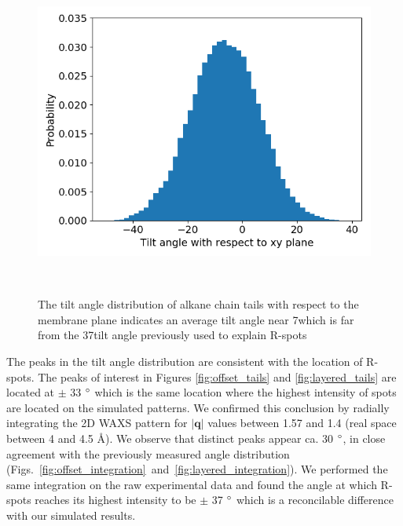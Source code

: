 \documentclass{article}
\begin{document}
  \begin{figure}
  \centering
  \includegraphics[width=0.5\linewidth]{tilt_dist.png}
  \caption{The tilt angle distribution of alkane chain tails with respect to the membrane plane
  indicates an average tilt angle near 7\degree which is far from the 37\degree tilt angle 
  previously used to explain R-spots}~\label{fig:tilt}
  \end{figure}

  The peaks in the tilt angle distribution are consistent with the location of
  R-spots. The peaks of interest in Figures \ref{fig:offset_tails} and
  \ref{fig:layered_tails} are located at $\pm$ 33 $\degree$ which is the same
  location where the highest intensity of spots are located on the simulated
  patterns. We confirmed this conclusion by radially integrating the 2D WAXS
  pattern for $\left|\mathbf{q}\right|$ values between 1.57 and 1.4 (real space between 4 and 4.5 \AA). We
  observe that distinct peaks appear ca. 30 $\degree$, in close agreement with
  the previously measured angle distribution
  (Figs.~\ref{fig:offset_integration}~and~\ref{fig:layered_integration}). We performed the
  same integration on the raw experimental data and found the angle at which
  R-spots reaches its highest intensity to be $\pm$ 37 $\degree$ which is a
  reconcilable difference with our simulated results.  
\end{document}
